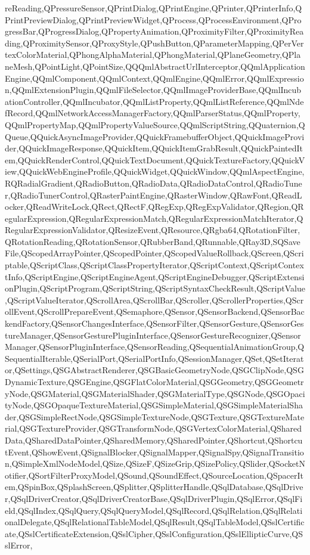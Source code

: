 {{reReading,QPressureSensor,QPrintDialog,QPrintEngine,QPrinter,QPrinterInfo,QPrintPreviewDialog,QPrintPreviewWidget,QProcess,QProcessEnvironment,QProgressBar,QProgressDialog,QPropertyAnimation,QProximityFilter,QProximityReading,QProximitySensor,QProxyStyle,QPushButton,QParameterMapping,QPerVertexColorMaterial,QPhongAlphaMaterial,QPhongMaterial,QPlaneGeometry,QPlaneMesh,QPointLight,QPointSize,QQQmlAbstractUrlInterceptor,QQmlApplicationEngine,QQmlComponent,QQmlContext,QQmlEngine,QQmlError,QQmlExpression,QQmlExtensionPlugin,QQmlFileSelector,QQmlImageProviderBase,QQmlIncubationController,QQmlIncubator,QQmlListProperty,QQmlListReference,QQmlNdefRecord,QQmlNetworkAccessManagerFactory,QQmlParserStatus,QQmlProperty,QQmlPropertyMap,QQmlPropertyValueSource,QQmlScriptString,QQuaternion,QQueue,QQuickAsyncImageProvider,QQuickFramebufferObject,QQuickImageProvider,QQuickImageResponse,QQuickItem,QQuickItemGrabResult,QQuickPaintedItem,QQuickRenderControl,QQuickTextDocument,QQuickTextureFactory,QQuickView,QQuickWebEngineProfile,QQuickWidget,QQuickWindow,QQmlAspectEngine,RQRadialGradient,QRadioButton,QRadioData,QRadioDataControl,QRadioTuner,QRadioTunerControl,QRasterPaintEngine,QRasterWindow,QRawFont,QReadLocker,QReadWriteLock,QRect,QRectF,QRegExp,QRegExpValidator,QRegion,QRegularExpression,QRegularExpressionMatch,QRegularExpressionMatchIterator,QRegularExpressionValidator,QResizeEvent,QResource,QRgba64,QRotationFilter,QRotationReading,QRotationSensor,QRubberBand,QRunnable,QRay3D,SQSaveFile,QScopedArrayPointer,QScopedPointer,QScopedValueRollback,QScreen,QScriptable,QScriptClass,QScriptClassPropertyIterator,QScriptContext,QScriptContextInfo,QScriptEngine,QScriptEngineAgent,QScriptEngineDebugger,QScriptExtensionPlugin,QScriptProgram,QScriptString,QScriptSyntaxCheckResult,QScriptValue,QScriptValueIterator,QScrollArea,QScrollBar,QScroller,QScrollerProperties,QScrollEvent,QScrollPrepareEvent,QSemaphore,QSensor,QSensorBackend,QSensorBackendFactory,QSensorChangesInterface,QSensorFilter,QSensorGesture,QSensorGestureManager,QSensorGesturePluginInterface,QSensorGestureRecognizer,QSensorManager,QSensorPluginInterface,QSensorReading,QSequentialAnimationGroup,QSequentialIterable,QSerialPort,QSerialPortInfo,QSessionManager,QSet,QSetIterator,QSettings,QSGAbstractRenderer,QSGBasicGeometryNode,QSGClipNode,QSGDynamicTexture,QSGEngine,QSGFlatColorMaterial,QSGGeometry,QSGGeometryNode,QSGMaterial,QSGMaterialShader,QSGMaterialType,QSGNode,QSGOpacityNode,QSGOpaqueTextureMaterial,QSGSimpleMaterial,QSGSimpleMaterialShader,QSGSimpleRectNode,QSGSimpleTextureNode,QSGTexture,QSGTextureMaterial,QSGTextureProvider,QSGTransformNode,QSGVertexColorMaterial,QSharedData,QSharedDataPointer,QSharedMemory,QSharedPointer,QShortcut,QShortcutEvent,QShowEvent,QSignalBlocker,QSignalMapper,QSignalSpy,QSignalTransition,QSimpleXmlNodeModel,QSize,QSizeF,QSizeGrip,QSizePolicy,QSlider,QSocketNotifier,QSortFilterProxyModel,QSound,QSoundEffect,QSourceLocation,QSpacerItem,QSpinBox,QSplashScreen,QSplitter,QSplitterHandle,QSqlDatabase,QSqlDriver,QSqlDriverCreator,QSqlDriverCreatorBase,QSqlDriverPlugin,QSqlError,QSqlField,QSqlIndex,QSqlQuery,QSqlQueryModel,QSqlRecord,QSqlRelation,QSqlRelationalDelegate,QSqlRelationalTableModel,QSqlResult,QSqlTableModel,QSslCertificate,QSslCertificateExtension,QSslCipher,QSslConfiguration,QSslEllipticCurve,QSslError,}}
